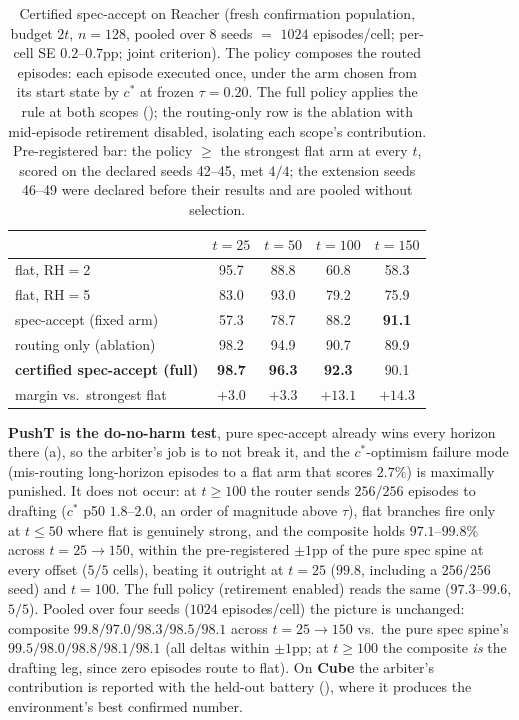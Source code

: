 \documentclass{article}
\newcommand{\ours}[1]{\textbf{#1}}
\begin{document}
\begin{table}[h]
\centering
\small
\caption{Certified spec-accept on Reacher (fresh confirmation population, budget
$2t$, $n{=}128$, pooled over 8 seeds $=$ $1024$ episodes/cell; per-cell SE
$0.2$--$0.7$pp; joint criterion). The policy composes the routed episodes: each
episode executed once, under the arm chosen from its start state by $c^{*}$ at frozen
$\tau{=}0.20$. The full policy applies the rule at both scopes
(); the routing-only row is the ablation with mid-episode
retirement disabled, isolating each scope's contribution. Pre-registered bar: the
policy $\ge$ the strongest flat arm at every $t$, scored on the declared seeds
42--45, met $4/4$; the extension seeds 46--49 were declared before their results and
are pooled without selection.}
\label{tab:unified}
\begin{tabular}{lcccc}
\toprule
& $t{=}25$ & $t{=}50$ & $t{=}100$ & $t{=}150$ \\
\midrule
flat, RH$=$2                  & 95.7 & 88.8 & 60.8 & 58.3 \\
flat, RH$=$5                  & 83.0 & 93.0 & 79.2 & 75.9 \\
spec-accept (fixed arm)       & 57.3 & 78.7 & 88.2 & \ours{91.1} \\
routing only (ablation)       & 98.2 & 94.9 & 90.7 & 89.9 \\
\ours{certified spec-accept (full)} & \ours{98.7} & \ours{96.3} & \ours{92.3} & 90.1 \\
\midrule
margin vs.\ strongest flat    & $+3.0$ & $+3.3$ & $+13.1$ & $+14.3$ \\
\bottomrule
\end{tabular}
\end{table}

\textbf{PushT is the do-no-harm test}, pure spec-accept already wins every horizon
there (a), so the arbiter's job is to not break it, and the
$c^{*}$-optimism failure mode (mis-routing long-horizon episodes to a flat arm that
scores $2.7\%$) is maximally punished. It does not occur: at $t{\ge}100$ the router
sends $256/256$ episodes to drafting ($c^{*}$ p50 $1.8$--$2.0$, an order of magnitude
above $\tau$), flat branches fire only at $t{\le}50$ where flat is genuinely strong,
and the composite holds $97.1$--$99.8\%$ across $t{=}25\to150$, within the
pre-registered $\pm1$pp of the pure spec spine at every offset ($5/5$ cells), beating
it outright at $t{=}25$ ($99.8$, including a $256/256$ seed) and $t{=}100$. The
full policy (retirement enabled) reads the same ($97.3$--$99.6$, $5/5$). Pooled over four seeds
($1024$ episodes/cell) the picture is unchanged: composite
$99.8/97.0/98.3/98.5/98.1$ across $t{=}25\to150$ vs.\ the pure spec spine's
$99.5/98.0/98.8/98.1/98.1$ (all deltas within $\pm1$pp; at $t{\ge}100$ the composite
\emph{is} the drafting leg, since zero episodes route to flat). On \textbf{Cube} the
arbiter's contribution is reported with the held-out battery
(), where it produces the environment's best confirmed
number.
\end{document}
